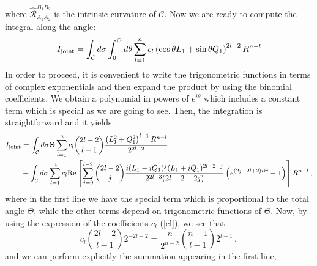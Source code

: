 \documentclass[11pt,letterpaper]{article}
\begin{document}
where $\hat{\mathcal{R}}^{B_1B_2}_{A_1A_2}$ is the intrinsic curvature of $\mathcal{C}$. Now we are ready to compute the integral along the angle:
\begin{equation}
I_{\rm joint}=\int_{\mathcal{C}}d\sigma \int_{0}^{\Theta} d\theta \sum_{l=1}^{n}c_l \left(\cos\theta L_1+\sin\theta  Q_1\right)^{2l-2}R^{n-l}
\end{equation}
In order to proceed, it is convenient to write the trigonometric functions in terms of complex exponentials and then expand the product by using the binomial coefficients. We obtain a polynomial in powers of $e^{i\theta}$ which includes a constant term which is special as we are going to see. 
Then, the integration is straightforward and it yields
\begin{equation}
\begin{aligned}
I_{\rm joint}&=\int_{\mathcal{C}}d\sigma \Theta\sum_{l=1}^{n}c_l\binom{2l-2}{l-1}\frac{\left(L_1^2+Q_1^2\right)^{l-1}R^{n-l}}{2^{2l-2}}\\
&+\int_{\mathcal{C}}d\sigma \sum_{l=1}^{n}c_l{\rm Re}\left[\sum_{j=0}^{l-2}\binom{2l-2}{j}\frac{i(L_1-iQ_1)^j(L_1+iQ_1)^{2l-2-j}}{2^{2l-3}(2l-2-2j)}\left(e^{(2j-2l+2)i\Theta}-1\right)\right]R^{n-l}\, ,
\end{aligned}
\end{equation}
where in the first line we have the special term which is proportional to the total angle $\Theta$, while the other terms depend on trigonometric functions of $\Theta$. 
Now, by using the expression of the coefficients $c_l$ (\ref{cl}), we see that
\begin{equation}
c_l\binom{2l-2}{l-1}2^{-2l+2}=\frac{n}{2^{n-2}}\binom{n-1}{l-1}2^{l-1}\, ,
\end{equation}
and we can perform explicitly the summation appearing in the first line,
\end{document}
